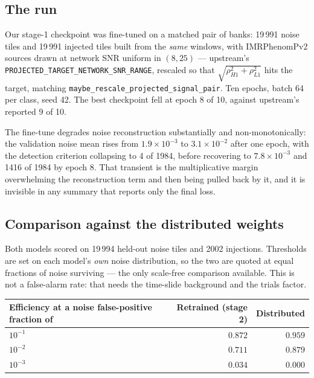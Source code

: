 \documentclass[11pt]{article}
\begin{document}
\subsection*{The run}

Our stage-1 checkpoint was fine-tuned on a matched pair of banks: 19\,991 noise tiles
and 19\,991 injected tiles built from the \emph{same} windows, with IMRPhenomPv2 sources
drawn at network SNR uniform in $(8, 25)$ --- upstream's
\texttt{PROJECTED\_TARGET\_NETWORK\_SNR\_RANGE}, rescaled so that
$\sqrt{\rho_{H1}^2+\rho_{L1}^2}$ hits the target, matching
\texttt{maybe\_rescale\_projected\_signal\_pair}. Ten epochs, batch 64 per class, seed
42. The best checkpoint fell at epoch 8 of 10, against upstream's reported 9 of 10.

The fine-tune degrades noise reconstruction substantially and non-monotonically: the
validation noise mean rises from $1.9\times10^{-3}$ to $3.1\times10^{-2}$ after one
epoch, with the detection criterion collapsing to 4 of 1984, before recovering to
$7.8\times10^{-3}$ and 1416 of 1984 by epoch 8. That transient is the multiplicative
margin overwhelming the reconstruction term and then being pulled back by it, and it is
invisible in any summary that reports only the final loss.

\subsection*{Comparison against the distributed weights}

Both models scored on 19\,994 held-out noise tiles and 2002 injections. Thresholds are
set on each model's \emph{own} noise distribution, so the two are quoted at equal
fractions of noise surviving --- the only scale-free comparison available. This is not a
false-alarm rate: that needs the time-slide background and the trials factor.

\begin{center}
\begin{tabular}{lrr}
\toprule
Efficiency at a noise false-positive fraction of & Retrained (stage 2) & Distributed \\
\midrule
$10^{-1}$ & $0.872$ & $\mathbf{0.959}$ \\
$10^{-2}$ & $0.711$ & $\mathbf{0.879}$ \\
$10^{-3}$ & $0.034$ & $0.000$ \\
\bottomrule
\end{tabular}
\end{center}
\end{document}
